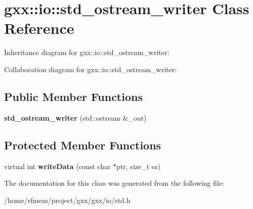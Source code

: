 \hypertarget{classgxx_1_1io_1_1std__ostream__writer}{}\section{gxx\+:\+:io\+:\+:std\+\_\+ostream\+\_\+writer Class Reference}
\label{classgxx_1_1io_1_1std__ostream__writer}


Inheritance diagram for gxx\+:\+:io\+:\+:std\+\_\+ostream\+\_\+writer\+:


Collaboration diagram for gxx\+:\+:io\+:\+:std\+\_\+ostream\+\_\+writer\+:
\subsection*{Public Member Functions}
\begin{DoxyCompactItemize}
\item 
{\bfseries std\+\_\+ostream\+\_\+writer} (std\+::ostream \&\+\_\+out)\hypertarget{classgxx_1_1io_1_1std__ostream__writer_ab54f5177e5caa86ea56653e10d5fc03f}{}\label{classgxx_1_1io_1_1std__ostream__writer_ab54f5177e5caa86ea56653e10d5fc03f}

\end{DoxyCompactItemize}
\subsection*{Protected Member Functions}
\begin{DoxyCompactItemize}
\item 
virtual int {\bfseries write\+Data} (const char $\ast$ptr, size\+\_\+t sz)\hypertarget{classgxx_1_1io_1_1std__ostream__writer_aeb95cdb6085a6c306ba06e668a7e90dd}{}\label{classgxx_1_1io_1_1std__ostream__writer_aeb95cdb6085a6c306ba06e668a7e90dd}

\end{DoxyCompactItemize}


The documentation for this class was generated from the following file\+:\begin{DoxyCompactItemize}
\item 
/home/rfmeas/project/gxx/gxx/io/std.\+h\end{DoxyCompactItemize}

